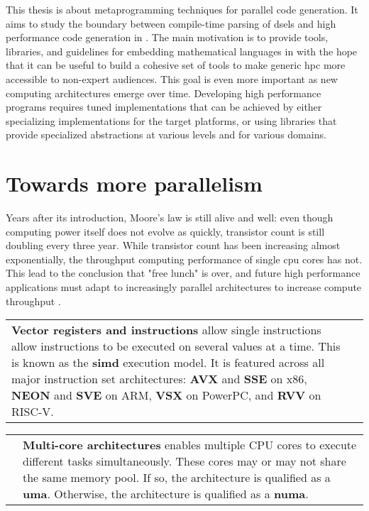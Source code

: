 \documentclass[main]{subfiles}
\begin{document}
This thesis is about metaprogramming techniques for parallel code generation.
It aims to study the boundary between compile-time parsing of
\glspl{dsel} and high performance code generation in \cpp.
The main motivation is to provide tools, libraries, and guidelines for embedding
mathematical languages in \cpp with the hope that it can be useful to build a
cohesive set of tools to make generic \gls{hpc} more accessible
to non-expert audiences. This goal is even more important as new computing
architectures emerge over time. Developing high performance programs requires
tuned implementations that can be achieved by either specializing
implementations for the target platforms, or using libraries that provide
specialized abstractions at various levels and for various domains.

\section{
  Towards more parallelism
}

Years after its introduction, Moore's law is still alive and well:
even though computing power itself does not evolve as quickly,
transistor count is still doubling every three year.
While transistor count has been increasing almost exponentially,
the throughput computing performance of single \gls{cpu} cores has not.
This lead to the conclusion that "free lunch" is over, and future
high performance applications must adapt to increasingly parallel architectures
to increase compute throughput
\cite{concurrency-revolution, doi:10.1142/S0129626404001829}.

\begin{center}
\begin{tabular}{p{} p{}}
\textbf{Vector registers and instructions}\footnotemark{} allow single instructions allow
instructions to be executed on several values at a time. This is known as
the \textbf{\gls{simd}} execution model. It is featured across all major
instruction set architectures:
\textbf{AVX} and \textbf{SSE} on x86, \textbf{NEON} and \textbf{SVE} on ARM,
\textbf{VSX} on PowerPC, and \textbf{RVV} on RISC-V.
&
\raisebox{-.925\height}{}
\end{tabular}
\end{center}

\begin{center}
\begin{tabular}{p{} p{}}
\raisebox{-.925\height}{}
&
\textbf{Multi-core architectures} enables multiple CPU cores to execute
different tasks simultaneously. These cores may or may not share the same
memory pool. If so, the architecture is qualified as a \textbf{\gls{uma}}.
Otherwise, the architecture is qualified as a \textbf{\gls{numa}}.
\end{tabular}
\end{center}
\end{document}
